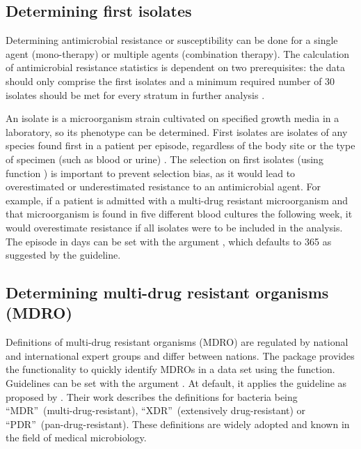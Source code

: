 \documentclass[article, shortnames]{jss}
\newcommand{\fct}[1]{\code{#1()}}
\begin{document}
\subsection{Determining first isolates} \label{firstisolates}

Determining antimicrobial resistance or susceptibility can be done for a
single agent (mono-therapy) or multiple agents (combination therapy).  The
calculation of antimicrobial resistance statistics is dependent on two
prerequisites: the data should only comprise the first isolates and a
minimum required number of 30 isolates should be met for every stratum in
further analysis \citep{Clinical_and_Laboratory_Standards_Institute2014-fb}.

An isolate is a microorganism strain cultivated on specified growth media in
a laboratory, so its phenotype can be determined.  First isolates are
isolates of any species found first in a patient per episode, regardless of
the body site or the type of specimen (such as blood or urine)
\citep{Clinical_and_Laboratory_Standards_Institute2014-fb}.  The selection
on first isolates (using function \fct{first\_isolate}) is important to
prevent selection bias, as it would lead to overestimated or underestimated
resistance to an antimicrobial agent.  For example, if a patient is admitted
with a multi-drug resistant microorganism and that microorganism is found in
five different blood cultures the following week, it would overestimate
resistance if all isolates were to be included in the analysis.  The episode
in days can be set with the argument , which defaults to
365 as suggested by the
\cite{Clinical_and_Laboratory_Standards_Institute2014-fb} guideline.

\subsection{Determining multi-drug resistant organisms (MDRO)}

Definitions of multi-drug resistant organisms (MDRO) are regulated by
national and international expert groups and differ between nations.  The
 package provides the functionality to quickly identify MDROs in a
data set using the \fct{mdro} function.  Guidelines can be set with the
argument .  At default, it applies the guideline as proposed
by \cite{Magiorakos2012}.  Their work describes the definitions for bacteria
being ``MDR''~(multi-drug-resistant), ``XDR''~(extensively drug-resistant) or
``PDR''~(pan-drug-resistant).  These definitions are widely adopted
\citep{Abat2018} and known in the field of medical microbiology.
\end{document}
